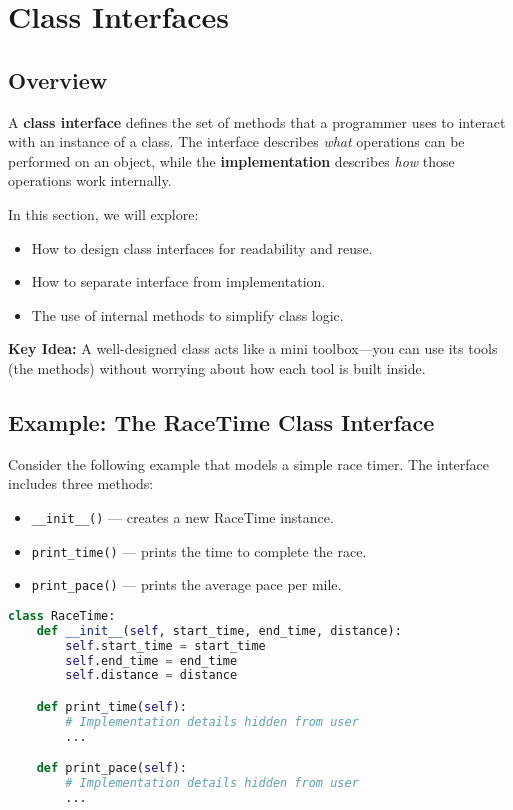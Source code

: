 \chapter{Class Interfaces}
\label{ch:09_07_class_interfaces}

\section*{Overview}
A \textbf{class interface} defines the set of methods that a programmer uses to interact with an instance of a class.  
The interface describes \emph{what} operations can be performed on an object, while the \textbf{implementation} describes \emph{how} those operations work internally.

In this section, we will explore:
\begin{itemize}
    \item How to design class interfaces for readability and reuse.
    \item How to separate interface from implementation.
    \item The use of internal methods to simplify class logic.
\end{itemize}

\vspace{1em}
\noindent
\textbf{Key Idea:} A well-designed class acts like a mini toolbox---you can use its tools (the methods) without worrying about how each tool is built inside.

\section{Example: The RaceTime Class Interface}

Consider the following example that models a simple race timer.  
The interface includes three methods:
\begin{itemize}
    \item \texttt{\_\_init\_\_()} — creates a new RaceTime instance.
    \item \texttt{print\_time()} — prints the time to complete the race.
    \item \texttt{print\_pace()} — prints the average pace per mile.
\end{itemize}

\begin{lstlisting}[language=Python, caption={A class interface consists of methods to interact with an instance.}]
class RaceTime:
    def __init__(self, start_time, end_time, distance):
        self.start_time = start_time
        self.end_time = end_time
        self.distance = distance

    def print_time(self):
        # Implementation details hidden from user
        ...

    def print_pace(self):
        # Implementation details hidden from user
        ...
\end{lstlisting}

